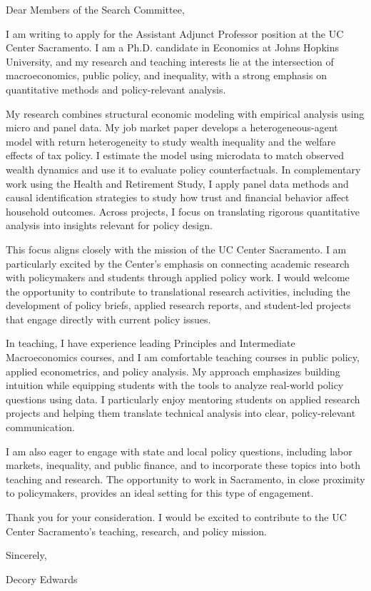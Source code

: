 \documentclass[11pt]{letter}
\begin{document}
\begin{letter}{}

\opening{Dear Members of the Search Committee,}

I am writing to apply for the Assistant Adjunct Professor position at the UC Center Sacramento. I am a Ph.D. candidate in Economics at Johns Hopkins University, and my research and teaching interests lie at the intersection of macroeconomics, public policy, and inequality, with a strong emphasis on quantitative methods and policy-relevant analysis.

My research combines structural economic modeling with empirical analysis using micro and panel data. My job market paper develops a heterogeneous-agent model with return heterogeneity to study wealth inequality and the welfare effects of tax policy. I estimate the model using microdata to match observed wealth dynamics and use it to evaluate policy counterfactuals. In complementary work using the Health and Retirement Study, I apply panel data methods and causal identification strategies to study how trust and financial behavior affect household outcomes. Across projects, I focus on translating rigorous quantitative analysis into insights relevant for policy design.

This focus aligns closely with the mission of the UC Center Sacramento. I am particularly excited by the Center’s emphasis on connecting academic research with policymakers and students through applied policy work. I would welcome the opportunity to contribute to translational research activities, including the development of policy briefs, applied research reports, and student-led projects that engage directly with current policy issues.

In teaching, I have experience leading Principles and Intermediate Macroeconomics courses, and I am comfortable teaching courses in public policy, applied econometrics, and policy analysis. My approach emphasizes building intuition while equipping students with the tools to analyze real-world policy questions using data. I particularly enjoy mentoring students on applied research projects and helping them translate technical analysis into clear, policy-relevant communication.

I am also eager to engage with state and local policy questions, including labor markets, inequality, and public finance, and to incorporate these topics into both teaching and research. The opportunity to work in Sacramento, in close proximity to policymakers, provides an ideal setting for this type of engagement.

Thank you for your consideration. I would be excited to contribute to the UC Center Sacramento’s teaching, research, and policy mission.

\closing{Sincerely,}

\vspace{0.5cm}

Decory Edwards

\end{letter}
\end{document}
